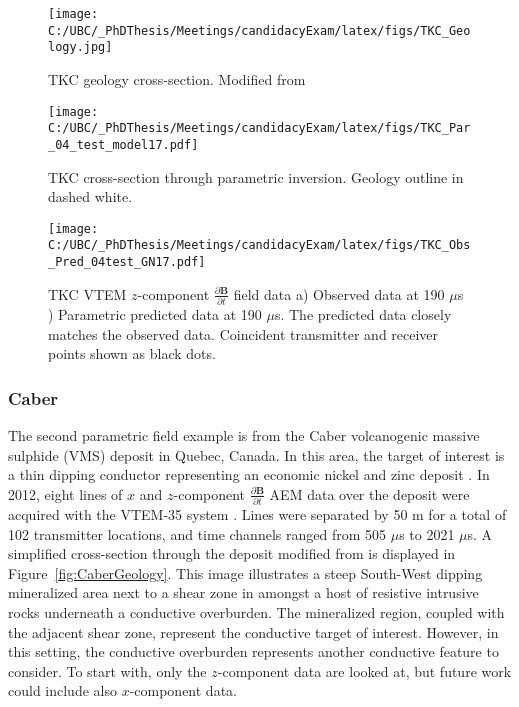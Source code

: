 \documentclass[letterpaper,11pt]{article}
\begin{document}
\clearpage
\begin{figure}[h]
\centering
\begin{minipage}{.48\textwidth}
  \centering
  \texttt{[image: C:/UBC/\_PhDThesis/Meetings/candidacyExam/latex/figs/TKC\_Geology.jpg]}
  \caption{TKC geology cross-section. \newline Modified from \cite{Harder2008}}
  \label{fig:TKCGeology}
\end{minipage}
\begin{minipage}{.48\textwidth}
  \centering
  \texttt{[image: C:/UBC/\_PhDThesis/Meetings/candidacyExam/latex/figs/TKC\_Par\_04\_test\_model17.pdf]}
  \caption{TKC cross-section through parametric inversion. Geology outline in dashed white.}
  \label{fig:TKCParInv}
\end{minipage}
\end{figure}
\begin{figure}[h]
  \centering
  \texttt{[image: C:/UBC/\_PhDThesis/Meetings/candidacyExam/latex/figs/TKC\_Obs\_Pred\_04test\_GN17.pdf]}
  \caption{TKC VTEM $ z $-component $ \frac{\partial\mathbf{B}}{\partial t} $ field data a) Observed data at 190 $ \mu $s ) Parametric predicted data at 190 $ \mu $s. The predicted data closely matches the observed data. Coincident transmitter and receiver points shown as black dots.}
  \label{fig:TKCParData}
\end{figure}

\clearpage
\subsubsection{Caber}
The second parametric field example is from the Caber volcanogenic massive sulphide (VMS) deposit in Quebec, Canada.  In this area, the target of interest is a thin dipping conductor representing an economic nickel and zinc deposit \cite[]{Carr,Adair2011}. In 2012, eight lines of $ x $ and $z$-component $ \frac{\partial\mathbf{B}}{\partial t} $ AEM data over the deposit were acquired with the VTEM-35 system \cite[]{Geotech2012}.  Lines were separated by 50 m for a total of 102 transmitter locations, and time channels ranged from 505 $ \mu $s to 2021 $ \mu $s. A simplified cross-section through the deposit modified from \cite{Legault2010} is displayed in Figure~\ref{fig:CaberGeology}.  This image illustrates a steep South-West dipping mineralized area next to a shear zone in amongst a host of resistive intrusive rocks underneath a conductive overburden.  The mineralized region, coupled with the adjacent shear zone, represent the conductive target of interest. However, in this setting, the conductive overburden represents another conductive feature to consider.  To start with, only the $z$-component data are looked at, but future work could include also $ x $-component data.
\end{document}
